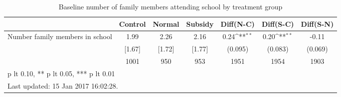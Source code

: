 \begin{table}[htbp]\centering
\def\sym#1{\ifmmode^{#1}\else\(^{#1}\)\fi}
\caption{Baseline number of family members attending school by treatment group \label{tab:"balance"}}
\begin{tabular*}{1\hsize}{@{\hskip\tabcolsep\extracolsep\fill}l*{1}{cccccc}}
\toprule
                                &  Control&   Normal&  Subsidy&Diff(N-C)         &Diff(S-C)         &Diff(S-N)         \\
\midrule
Number family members in school &     1.99&     2.26&     2.16&     0.24\sym{**} &     0.20\sym{**} &    -0.11         \\
                                &   [1.67]&   [1.72]&   [1.77]&  (0.095)         &  (0.083)         &  (0.069)         \\
                                &     1001&      950&      953&     1951         &     1954         &     1903         \\
\bottomrule
\multicolumn{7}{l}{\footnotesize * p lt 0.10, ** p lt 0.05, *** p lt 0.01}\\
\multicolumn{7}{l}{\footnotesize Last updated: 15 Jan 2017 16:02:28.}\\
\end{tabular*}
\end{table}
